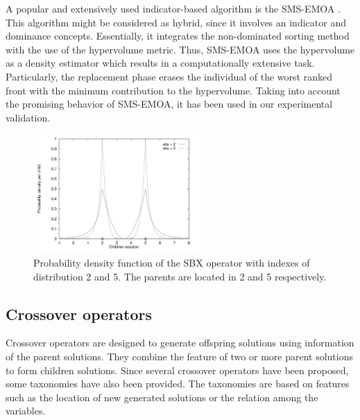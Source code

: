 A popular and extensively used indicator-based algorithm is the SMS-EMOA \cite{Joel:SMSEMOA}.
%
This algorithm might be considered as hybrid, since it involves an indicator and dominance concepts.
%
Essentially, it integrates the non-dominated sorting method with the use of the hypervolume metric.
%
Thus, SMS-EMOA uses the hypervolume as a density estimator which results in a computationally extensive task.
%
Particularly, the replacement phase erases the individual of the worst ranked front with the minimum contribution to the hypervolume.
%
Taking into account the promising behavior of SMS-EMOA, it has been used in our experimental validation.
%
%
\begin{figure}[!t]
\centering
\includegraphics[width=2.5in]{img/DensitySBX_English.png}
\caption{Probability density function of the SBX operator with indexes of distribution 2 and 5. The parents are located in 2 and 5 respectively.}
\label{fig:fig_sim}
\end{figure}
\subsection{Crossover operators}
Crossover operators are designed to generate offspring solutions using information of the parent solutions.
%
They combine the feature of two or more parent solutions to form children solutions.
%
Since several crossover operators have been proposed, some taxonomies have also been provided.
%
The taxonomies are based on features such as the location of new generated solutions or the relation among the variables.
%


